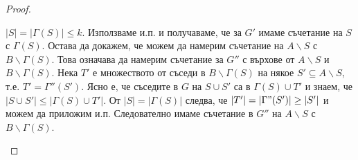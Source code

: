 \begin{proof}
\begin{enumerate}
\begin{enumerate}
\begin{enumerate}
        $|S| = |\Gamma(S)| \leq k$.
        Използваме и.п. и получаваме, че за $G'$ имаме съчетание на $S$ с $\Gamma(S)$.
        Остава да докажем, че можем да намерим съчетание на $A\backslash S$ с $B\backslash \Gamma(S)$.
        Това означава да намерим съчетание за $G''$ с върхове от $A\backslash S$ и $B\backslash \Gamma(S)$.
        Нека $T'$ е множеството от съседи в $B\backslash \Gamma(S)$ на някое $S'\subseteq A\backslash S$, 
        т.е. $T' = \Gamma''(S')$.
        Ясно е, че съседите в $G$ на $S\cup S'$ са в $\Gamma(S)\cup T'$ и знаем, че $|S\cup S'| \leq |\Gamma(S)\cup T'|$.
        От $|S| = |\Gamma(S)|$ следва, че $|T'| = |\Gamma"(S')| \geq |S'|$ и можем да приложим и.п.
        Следователно имаме съчетание в $G''$ на $A\backslash S$ с $B\backslash \Gamma(S)$. 
      \end{enumerate}
    \end{enumerate}
    

\end{enumerate}
\end{proof}
